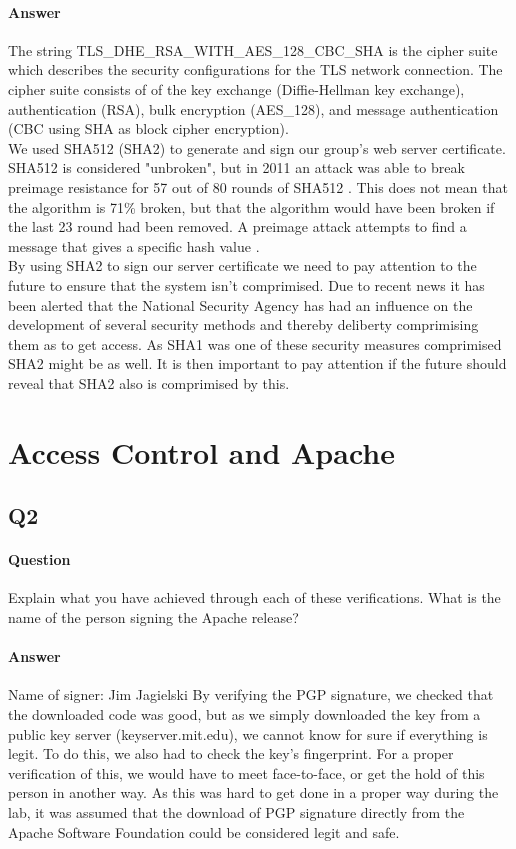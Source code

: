 \documentclass[11pt, a4paper]{article}
\begin{document}
\paragraph{Answer}
The string TLS\_DHE\_RSA\_WITH\_AES\_128\_CBC\_SHA is the cipher suite which describes the security configurations for the TLS network connection. The cipher suite consists of of the key exchange (Diffie-Hellman key exchange), authentication (RSA), bulk encryption (AES\_128), and message authentication (CBC using SHA as block cipher encryption). \\

We used SHA512 (SHA2) to generate and sign our group's web server certificate. SHA512 is considered "unbroken", but in 2011 an attack was able to break preimage resistance  for 57 out of 80 rounds of SHA512 \cite{sha512-attack}. This does not mean that the algorithm is 71\% broken, but that the algorithm would have been broken if the last 23 round had been removed. A preimage attack attempts to find a message that gives a specific hash value \cite{preimage-resistance}.\\

By using SHA2 to sign our server certificate we need to pay attention to the future to ensure that the system isn't comprimised. Due to recent news it has been alerted that the National Security Agency has had an influence on the development of several security methods and thereby deliberty comprimising them as to get access. As SHA1 was one of these security measures comprimised SHA2 might be as well. It is then important to pay attention if the future should reveal that SHA2 also is comprimised by this.

\section{Access Control and Apache}
\subsection{Q2}
\paragraph{Question}
Explain what you have achieved through each of these verifications. What is the name
of the person signing the Apache release?
\paragraph{Answer}
Name of signer: Jim Jagielski
By verifying the PGP signature, we checked that the downloaded code was good, but as we simply downloaded the key from a public key server (keyserver.mit.edu), we cannot know for sure if everything is legit. To do this, we also had to check the key's fingerprint. For a proper verification of this, we would have to meet face-to-face, or get the hold of this person in another way. As this was hard to get done in a proper way during the lab, it was assumed that the download of PGP signature directly from the Apache Software Foundation could be considered legit and safe.
\end{document}
